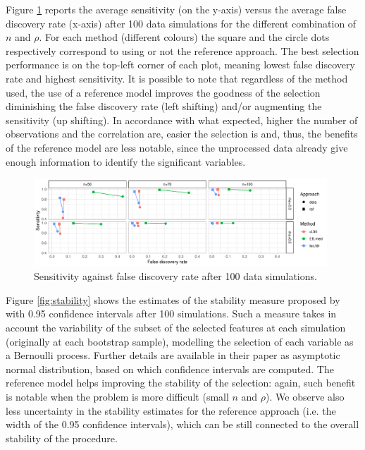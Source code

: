 \documentclass[american,]{article}
\theoremstyle{definition}
\begin{document}
Figure \ref{fig:sensitivity_vs_fdr} reports the average sensitivity (on the y-axis) versus the average false discovery rate (x-axis) after 100 data simulations for the different combination of $n$ and $\rho$. For each method (different colours) the square and the circle dots respectively correspond to using or not the reference approach. The best selection performance is on the top-left corner of each plot, meaning lowest false discovery rate and highest sensitivity. It is possible to note that regardless of the method used, the use of a reference model improves the goodness of the selection diminishing the false discovery rate (left shifting) and/or augmenting the sensitivity (up shifting). In accordance with what expected, higher the number of observations and the correlation are, easier the selection is and, thus, the benefits of the reference model are less notable, since the unprocessed data already give enough information to identify the significant variables.

\begin{figure}[tp]
  \centering
  \includegraphics[width=0.98\textwidth]{graphics/sensitivity_vs_fdr.pdf}
  \caption{Sensitivity against false discovery rate after 100 data simulations.\\}
  \label{fig:sensitivity_vs_fdr}
\end{figure}

Figure \ref{fig:stability} shows the estimates of the stability measure proposed by \cite{paper:stability} with 0.95 confidence intervals after 100 simulations. Such a measure takes in account the variability of the subset of the selected features at each simulation (originally at each bootstrap sample), modelling the selection of each variable as a Bernoulli process. Further details are available in their paper as asymptotic normal distribution, based on which confidence intervals are computed. The reference model helps improving the stability of the selection: again, such benefit is notable when the problem is more difficult (small $n$ and $\rho$). We observe also less uncertainty in the stability estimates for the reference approach (i.e. the width of the 0.95 confidence intervals), which can be still connected to the overall stability of the procedure.
\end{document}
